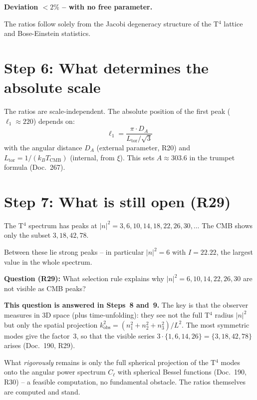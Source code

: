 \textbf{Deviation $< 2\%$ -- with no free parameter.}

The ratios follow solely from the Jacobi degeneracy structure
of the T$^4$ lattice and Bose-Einstein statistics.

\section{Step 6: What determines the absolute scale}

The ratios are scale-independent. The absolute position of the
first peak ($\ell_1 \approx 220$) depends on:
\[
  \ell_1 = \frac{\pi \cdot D_A}{L_\mathrm{tor} / \sqrt{3}}
\]
with the angular distance $D_A$ (external parameter, R20) and
$L_\mathrm{tor} = 1/(k_B T_\mathrm{CMB})$ (internal, from $\xi$).
This sets $A \approx 303{.}6$ in the trumpet formula (Doc.~267).

\section{Step 7: What is still open (R29)}

The T$^4$ spectrum has peaks at $|n|^2 = 3, 6, 10, 14, 18, 22, 26, 30, \ldots$
The CMB shows only the subset $3, 18, 42, 78$.

Between these lie strong peaks -- in particular $|n|^2 = 6$ with
$I = 22{.}22$, the largest value in the whole spectrum.

\textbf{Question (R29):} What selection rule explains why
$|n|^2 = 6, 10, 14, 22, 26, 30$ are not visible as CMB peaks?

\textbf{This question is answered in Steps~8 and~9.} The key is that
the observer measures in 3D space (plus time-unfolding): they see not
the full T$^4$ radius $|n|^2$ but only the spatial projection
$k_\mathrm{obs}^2 = (n_1^2 + n_2^2 + n_3^2)/L^2$. The most symmetric
modes give the factor~3, so that the visible series
$3\cdot\{1,6,14,26\} = \{3,18,42,78\}$ arises (Doc.~190, R29).

What \emph{rigorously} remains is only the full spherical projection
of the T$^4$ modes onto the angular power spectrum $C_\ell$ with
spherical Bessel functions (Doc.~190, R30) -- a feasible computation,
no fundamental obstacle. The ratios themselves are computed and stand.

